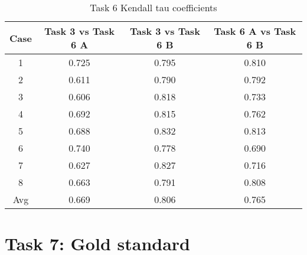 \begin{table}[htbp] \footnotesize \center
\caption{Task 6 Kendall tau coefficients\label{tab:task6kendall}}
\begin{tabular}{c c c c}
    \toprule
	Case & Task 3 vs Task 6 A & Task 3 vs Task 6 B & Task 6 A vs Task 6 B \\
    \midrule
	1 & 0.725 & 0.795 & 0.810 \\
	2 & 0.611 & 0.790 & 0.792 \\
	3 & 0.606 & 0.818 & 0.733 \\
	4 & 0.692 & 0.815 & 0.762 \\
	5 & 0.688 & 0.832 & 0.813 \\
	6 & 0.740 & 0.778 & 0.690 \\
	7 & 0.627 & 0.827 & 0.716 \\
	8 & 0.663 & 0.791 & 0.808 \\
    \midrule
	Avg & 0.669 & 0.806 & 0.765 \\
	\bottomrule
\end{tabular}
\end{table}


\section{Task 7: Gold standard}



